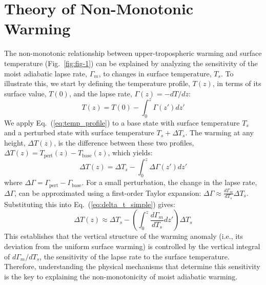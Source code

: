 \documentclass{ametsocV6.1}
\begin{document}
\section{Theory of Non-Monotonic Warming}
The non-monotonic relationship between upper-tropospheric warming and surface temperature (Fig.~\ref{fig:fig-1}) can be explained by analyzing the sensitivity of the moist adiabatic lapse rate, $\Gamma_m$, to changes in surface temperature, $T_s$. To illustrate this, we start by defining the temperature profile, $T(z)$, in terms of its surface value, $T(0)$, and the lapse rate, $\Gamma(z)=-dT/dz$:
\begin{equation}
T(z)=T(0)-\int_0^z \Gamma(z')dz' \label{eq:temp_profile}
\end{equation}
We apply Eq.~(\ref{eq:temp_profile}) to a base state with surface temperature $T_s$ and a perturbed state with surface temperature $T_s + \Delta T_s$. The warming at any height, $\Delta T(z)$, is the difference between these two profiles, $\Delta T(z) = T_{\text{pert}}(z) - T_{\text{base}}(z)$, which yields:
\begin{equation}
\Delta T(z)=\Delta T_s-\int_0^z\Delta \Gamma(z')dz' \label{eq:delta_t_simple}
\end{equation}
where $\Delta \Gamma = \Gamma_{\text{pert}} - \Gamma_{\text{base}}$. For a small perturbation, the change in the lapse rate, $\Delta\Gamma$, can be approximated using a first-order Taylor expansion: $\Delta\Gamma\approx \frac{d\Gamma_m}{dT_s} \Delta T_s$. Substituting this into Eq.~(\ref{eq:delta_t_simple}) gives:
\begin{equation}
\Delta T(z)\approx\Delta T_s-\left(\int_0^z\frac{d\Gamma_m}{dT_s}dz'\right)\Delta T_s \label{eq:delta_t_taylor}
\end{equation}
This establishes that the vertical structure of the warming anomaly (i.e., its deviation from the uniform surface warming) is controlled by the vertical integral of $d\Gamma_m/dT_s$, the sensitivity of the lapse rate to the surface temperature. Therefore, understanding the physical mechanisms that determine this sensitivity is the key to explaining the non-monotonicity of moist adiabatic warming.
\end{document}
